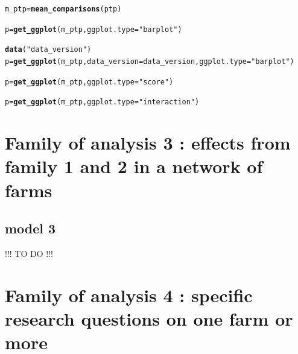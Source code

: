 \documentclass{book}\usepackage[]{graphicx}\usepackage[]{color}
\makeatletter
\newcommand{\hlstr}[1]{\textcolor[rgb]{0.192,0.494,0.8}{#1}}%
\newcommand{\hlstd}[1]{\textcolor[rgb]{0.345,0.345,0.345}{#1}}%
\newcommand{\hlkwb}[1]{\textcolor[rgb]{0.69,0.353,0.396}{#1}}%
\newcommand{\hlkwc}[1]{\textcolor[rgb]{0.333,0.667,0.333}{#1}}%
\newcommand{\hlkwd}[1]{\textcolor[rgb]{0.737,0.353,0.396}{\textbf{#1}}}%
\newenvironment{kframe}{%
 \def\at@end@of@kframe{}%
 \ifinner\ifhmode%
  \def\at@end@of@kframe{\end{minipage}}%
  \begin{minipage}{\columnwidth}%
 \fi\fi%
 \def\FrameCommand##1{\hskip\@totalleftmargin \hskip-\fboxsep
 \colorbox{shadecolor}{##1}\hskip-\fboxsep
     \hskip-\linewidth \hskip-\@totalleftmargin \hskip\columnwidth}%
 \MakeFramed {\advance\hsize-\width
   \@totalleftmargin\z@ \linewidth\hsize
   \@setminipage}}%
 {\par\unskip\endMakeFramed%
 \at@end@of@kframe}
\newenvironment{knitrout}{}{} %
\makeatother
\begin{document}
\begin{knitrout}
\color{fgcolor}\begin{kframe}
\begin{alltt}
\hlstd{m_ptp} \hlkwb{=} \hlkwd{mean_comparisons}\hlstd{(ptp)}

\hlstd{p} \hlkwb{=} \hlkwd{get_ggplot}\hlstd{(m_ptp,} \hlkwc{ggplot.type} \hlstd{=} \hlstr{"barplot"}\hlstd{)}

\hlkwd{data}\hlstd{(}\hlstr{"data_version"}\hlstd{)}
\hlstd{p} \hlkwb{=} \hlkwd{get_ggplot}\hlstd{(m_ptp,} \hlkwc{data_version} \hlstd{= data_version,} \hlkwc{ggplot.type} \hlstd{=} \hlstr{"barplot"}\hlstd{)}
\end{alltt}


{\ttfamily\noindent\color{warningcolor}{\#\# Warning in FUN(X[[i]], ...): data\_mean\_comparisons: the following environments in data\_version are not taken: env1-1:2010, env1-2:2010, env1-1:2012, env5:2010.}}

{\ttfamily\noindent\bfseries\color{errorcolor}{\#\# Error in FUN(X[[i]], ...): The following entries do not exist in the data: tem-1, tem-2, pop-1, pop-2, tem-1, tem-2, pop-1, pop-2, pop-1, pop-2, pop-3, pop-5}}\begin{alltt}
\hlstd{p} \hlkwb{=} \hlkwd{get_ggplot}\hlstd{(m_ptp,} \hlkwc{ggplot.type} \hlstd{=} \hlstr{"score"}\hlstd{)}

\hlstd{p} \hlkwb{=} \hlkwd{get_ggplot}\hlstd{(m_ptp,} \hlkwc{ggplot.type} \hlstd{=} \hlstr{"interaction"}\hlstd{)}
\end{alltt}
\end{kframe}
\end{knitrout}

\newpage


\section{Family of analysis 3 : effects from family 1 and 2 in a network of farms}
\label{section_analysis3}


\subsection{model 3 }
\label{model_3}

!!! TO DO !!!

\newpage

\section{Family of analysis 4 : specific research questions on one farm or more}
\label{section_analysis4}
\end{document}
